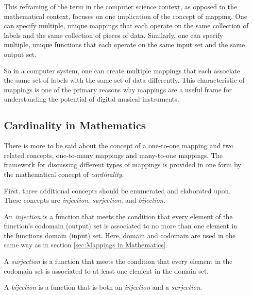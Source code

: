 This reframing of the term in the computer science context, as opposed to the mathematical context, focuses on one implication of the concept of mapping. One can specify multiple, unique mappings that each operate on the same collection of labels and the same collection of pieces of data. Similarly, one can specify multiple, unique functions that each operate on the same input set and the same output set. 

So in a computer system, one can create multiple mappings that each associate the same set of labels with the same set of data differently. This characteristic of mappings is one of the primary reasons why mappings are a useful frame for understanding the potential of digital musical instruments. 

\subsection{Cardinality in Mathematics}

There is more to be said about the concept of a one-to-one mapping and two related concepts, one-to-many mappings and many-to-one mappings. The framework for discussing different types of mappings is provided in one form by the mathematical concept of \emph{cardinality}.

First, three additional concepts should be enumerated and elaborated upon. These concepts are \emph{injection}, \emph{surjection}, and \emph{bijection}.

An \emph{injection} is a function that meets the condition that every element of the function's codomain (output) set is associated to no more than one element in the functions domain (input) set. Here, domain and codomain are used in the same way as in section \ref{sec:Mappings in Mathematics}.

A \emph{surjection} is a function that meets the condition that every element in the codomain set is associated to at least one element in the domain set.

A \emph{bijection} is a function that is both an \emph{injection} and a \emph{surjection}.


